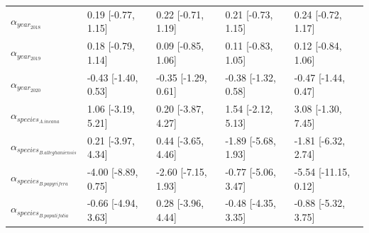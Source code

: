 \begin{table}[ht]
\begin{tabular}{lllll}
  $\alpha_{year_{2018}}$ & 0.19 [-0.77, 1.15] & 0.22 [-0.71, 1.19] & 0.21 [-0.73, 1.15] & 0.24 [-0.72, 1.17] \\ 
  $\alpha_{year_{2019}}$ & 0.18 [-0.79, 1.14] & 0.09 [-0.85, 1.06] & 0.11 [-0.83, 1.05] & 0.12 [-0.84, 1.06] \\ 
  $\alpha_{year_{2020}}$ & -0.43 [-1.40, 0.53] & -0.35 [-1.29, 0.61] & -0.38 [-1.32, 0.58] & -0.47 [-1.44, 0.47] \\ 
  $\alpha_{species_{A. incana}}$ & 1.06 [-3.19, 5.21] & 0.20 [-3.87, 4.27] & 1.54 [-2.12, 5.13] & 3.08 [-1.30, 7.45] \\ 
  $\alpha_{species_{B. alleghaniensis}}$ & 0.21 [-3.97, 4.34] & 0.44 [-3.65, 4.46] & -1.89 [-5.68, 1.93] & -1.81 [-6.32, 2.74] \\ 
  $\alpha_{species_{B. papyrifera}}$ & -4.00 [-8.89, 0.75] & -2.60 [-7.15, 1.93] & -0.77 [-5.06, 3.47] & -5.54 [-11.15, 0.12] \\ 
  $\alpha_{species_{B. populifolia}}$ & -0.66 [-4.94, 3.63] & 0.28 [-3.96, 4.44] & -0.48 [-4.35, 3.35] & -0.88 [-5.32, 3.75] \\ 
   \hline
\end{tabular}
\end{table}


